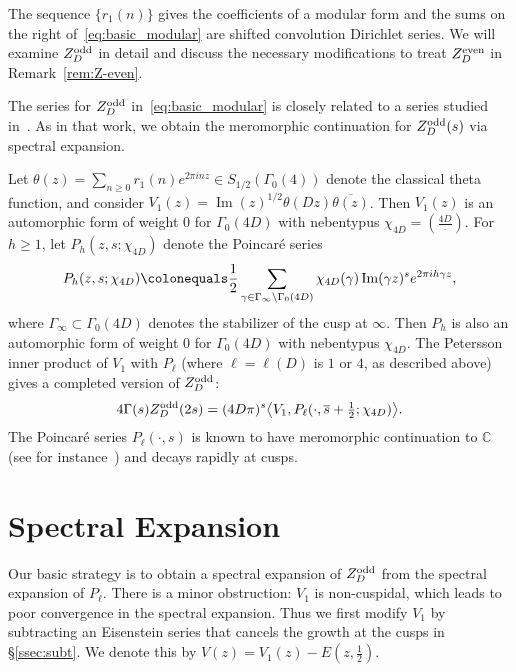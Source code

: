 \documentclass[11pt,reqno,oneside]{amsart}
\theoremstyle{plain}
\theoremstyle{definition}
\renewcommand{\Im}{\operatorname{Im}}
\newcommand{\sbar}{\overline{s}}
\newcommand{\Zeven}{Z_D^{\textup{even}}}
\newcommand{\Zodd}{Z_D^{\textup{odd}}}
\newcommand{\chid}{\chi_{4D}}
\begin{document}
The sequence $\{r_1(n)\}$ gives the coefficients of a modular form and the sums
on the right of~\eqref{eq:basic_modular} are shifted convolution Dirichlet
series.
We will examine $\Zodd$ in detail and discuss the necessary modifications to treat
$\Zeven$ in Remark~\ref{rem:Z-even}.

The series for $\Zodd$ in~\eqref{eq:basic_modular} is closely related to a
series studied in~\cite[\S3]{hkldw_3aps}.
As in that work, we obtain the meromorphic continuation for $\Zodd(s)$ via spectral
expansion.

Let $\theta(z) = \sum_{n \ge 0} r_1(n) e^{2 \pi i n z} \in S_{1/2}(\Gamma_0(4))$ denote
the classical theta function, and consider
$V_1(z) = \Im(z)^{1/2} \theta(Dz) \overline{\theta(z)}$.
Then $V_1(z)$ is an automorphic form of weight $0$ for $\Gamma_0(4D)$ with nebentypus
$\chid = \left( \frac{4D}{\cdot} \right)$.
For $h \ge 1$, let $P_h(z, s; \chid)$ denote the Poincar{\'e} series
\begin{equation} \label{eq:P-h-definition}
  P_h(z, s; \chid) \colonequals
  \frac{1}{2} \sum_{\gamma \in \Gamma_{\infty} \backslash \Gamma_0(4D)}
  \chid(\gamma) \Im(\gamma z)^s e^{2 \pi i h \gamma z},
\end{equation}
where $\Gamma_\infty \subset \Gamma_0(4D)$ denotes the stabilizer of the cusp at $\infty$.
Then $P_h$ is also an automorphic form of weight $0$ for $\Gamma_0(4D)$ with
nebentypus $\chid$.
The Petersson inner product of $V_1$ with $P_\ell$ (where $\ell =
  \ell(D)$ is $1$ or $4$, as described above) gives a completed version
of $\Zodd$:
\begin{equation}\label{eq:spectral_base}
  4 \Gamma(s) \Zodd(2s)
  = (4D \pi)^{s}
  \bigl\langle V_1, P_\ell(\cdot, \sbar + \tfrac{1}{2}; \chid) \bigr\rangle.
\end{equation}
The Poincar\'e series $P_\ell(\cdot, s)$ is known to have meromorphic
continuation to $\mathbb{C}$ (see for instance~\cite[\S15]{iwanieckowalski04}) and
decays rapidly at cusps.


\section{Spectral Expansion}

Our basic strategy is to obtain a spectral expansion of $\Zodd$
from the spectral expansion of $P_\ell$.
There is a minor obstruction: $V_1$ is non-cuspidal, which leads to poor convergence in the spectral expansion.
Thus we first modify $V_1$ by subtracting an Eisenstein series that cancels the
growth at the cusps in \S\ref{ssec:subt}.
We denote this by $V(z) = V_1(z) - E(z, \tfrac{1}{2})$.
\end{document}
